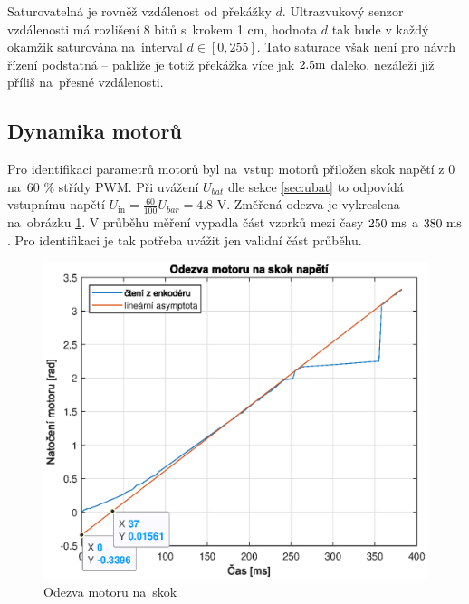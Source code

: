 \documentclass[conference]{IEEEtran}
\begin{document}
Saturovatelná je rovněž vzdálenost od překážky $d$. Ultrazvukový senzor vzdálenosti má rozlišení 8 bitů s~krokem 1 \si{\centi\metre},
hodnota $d$ tak bude v každý okamžik saturována na~interval $d \in \left[0, 255\right]$. Tato saturace však není pro návrh řízení podstatná --
pakliže je totiž překážka více jak $2.5 \text{\si{\metre}}$ daleko, nezáleží již příliš na~přesné vzdálenosti.

\subsection{Dynamika motorů}

Pro identifikaci parametrů motorů byl na~vstup motorů přiložen skok napětí z $0$ na~$60$ \% střídy PWM.
Při uvážení $U_{bat}$ dle sekce \ref{sec:ubat} to odpovídá vstupnímu napětí $U_\text{in} = \frac{60}{100} U_{bar} = 4.8$ \si{\volt}.
Změřená odezva je vykreslena na~obrázku \ref{fig:motor_skok}. V průběhu měření vypadla část vzorků mezi časy $250~\text{\si{\milli\second}}$ 
a $380~\text{\si{\milli\second}}$. Pro identifikaci je tak potřeba uvážit jen validní část průběhu.

\begin{figure}[htbp]
    \centerline{\includegraphics[width=\linewidth]{motor_skok.eps}}
    \caption{Odezva motoru na~skok}
    \label{fig:motor_skok}        
\end{figure}
\end{document}
